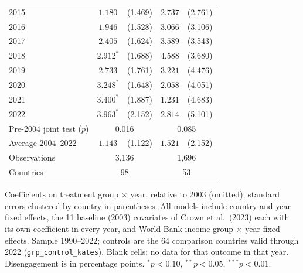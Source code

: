 \begin{table}[htbp]
\begin{tabular}{lcccc}
2015 & $1.180$ & (1.469) & $2.737$ & (2.761) \\
2016 & $1.946$ & (1.528) & $3.066$ & (3.106) \\
2017 & $2.405$ & (1.624) & $3.589$ & (3.543) \\
2018 & $2.912^{*}$ & (1.688) & $4.588$ & (3.680) \\
2019 & $2.733$ & (1.761) & $3.221$ & (4.476) \\
2020 & $3.248^{*}$ & (1.648) & $2.058$ & (4.051) \\
2021 & $3.400^{*}$ & (1.887) & $1.231$ & (4.683) \\
2022 & $3.963^{*}$ & (2.152) & $2.814$ & (5.101) \\
\midrule
Pre-2004 joint test ($p$) & \multicolumn{2}{c}{0.016} & \multicolumn{2}{c}{0.085} \\
Average 2004--2022 & $1.143$ & (1.122) & $1.521$ & (2.152) \\
Observations & \multicolumn{2}{c}{3,136} & \multicolumn{2}{c}{1,696} \\
Countries & \multicolumn{2}{c}{98} & \multicolumn{2}{c}{53} \\
\bottomrule
\end{tabular}
\par\vspace{4pt}
\begin{minipage}{\textwidth}\footnotesize Coefficients on treatment group $\times$ year, relative to 2003 (omitted); standard errors clustered by country in parentheses. All models include country and year fixed effects, the 11 baseline (2003) covariates of Crown et al.\ (2023) each with its own coefficient in every year, and World Bank income group $\times$ year fixed effects. Sample 1990--2022; controls are the 64 comparison countries valid through 2022 (\texttt{grp\_control\_kates}). Blank cells: no data for that outcome in that year. Disengagement is in percentage points. $^{*}p<0.10$, $^{**}p<0.05$, $^{***}p<0.01$.\end{minipage}
\end{table}

